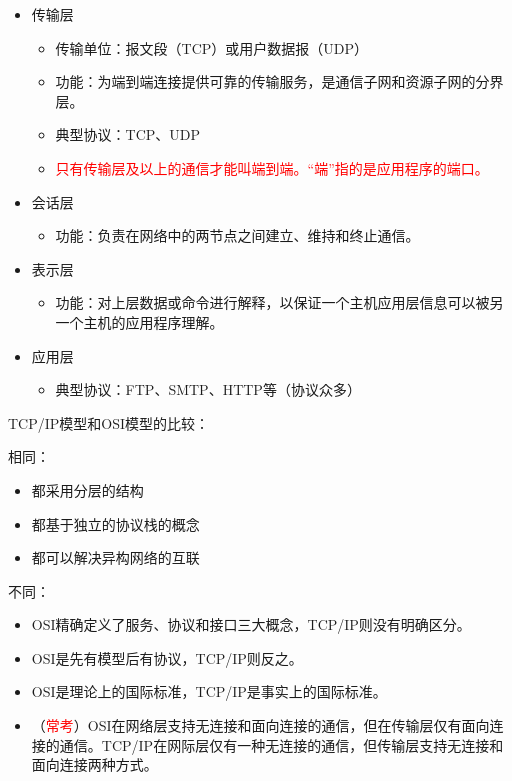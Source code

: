 \documentclass[12pt, a4paper, oneside]{ctexart}
\begin{document}
\begin{itemize}
    \item 传输层
    \begin{itemize}
        \item 传输单位：报文段（TCP）或用户数据报（UDP）
        \item 功能：为端到端连接提供可靠的传输服务，是通信子网和资源子网的分界层。
        \item 典型协议：TCP、UDP
        \item \textcolor{red}{只有传输层及以上的通信才能叫端到端。“端”指的是应用程序的端口。}
    \end{itemize}
    \item 会话层
    \begin{itemize}
        \item 功能：负责在网络中的两节点之间建立、维持和终止通信。
    \end{itemize}
    \item 表示层
    \begin{itemize}
        \item 功能：对上层数据或命令进行解释，以保证一个主机应用层信息可以被另一个主机的应用程序理解。
    \end{itemize}
    \item 应用层
    \begin{itemize}
        \item 典型协议：FTP、SMTP、HTTP等（协议众多）
    \end{itemize}
\end{itemize}

TCP/IP模型和OSI模型的比较：

相同：
\begin{itemize}
    \item 都采用分层的结构
    \item 都基于独立的协议栈的概念
    \item 都可以解决异构网络的互联
\end{itemize}

不同：
\begin{itemize}
    \item OSI精确定义了服务、协议和接口三大概念，TCP/IP则没有明确区分。
    \item OSI是先有模型后有协议，TCP/IP则反之。
    \item OSI是理论上的国际标准，TCP/IP是事实上的国际标准。
    \item （\textcolor{red}{常考}）OSI在网络层支持无连接和面向连接的通信，但在传输层仅有面向连接的通信。TCP/IP在网际层仅有一种无连接的通信，但传输层支持无连接和面向连接两种方式。
\end{itemize}
\end{document}

